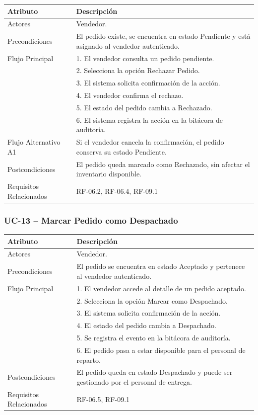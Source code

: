 \documentclass[12pt,a4paper]{report}
\begin{document}
\begin{longtable}{|p{4cm}|p{10cm}|}
\hline
\textbf{Atributo} & \textbf{Descripción} \\ \hline
Actores & Vendedor. \\ \hline
Precondiciones & El pedido existe, se encuentra en estado Pendiente y está asignado al vendedor autenticado. \\ \hline
Flujo Principal &
1. El vendedor consulta un pedido pendiente.\\
& 2. Selecciona la opción Rechazar Pedido.\\
& 3. El sistema solicita confirmación de la acción.\\
& 4. El vendedor confirma el rechazo.\\
& 5. El estado del pedido cambia a Rechazado.\\
& 6. El sistema registra la acción en la bitácora de auditoría. \\ \hline
Flujo Alternativo A1 & Si el vendedor cancela la confirmación, el pedido conserva su estado Pendiente. \\ \hline
Postcondiciones & El pedido queda marcado como Rechazado, sin afectar el inventario disponible. \\ \hline
Requisitos Relacionados & RF-06.2, RF-06.4, RF-09.1 \\ \hline
\end{longtable}


\subsubsection{UC-13 -- Marcar Pedido como Despachado}

\begin{longtable}{|p{4cm}|p{10cm}|}
\hline
\textbf{Atributo} & \textbf{Descripción} \\ \hline
Actores & Vendedor. \\ \hline
Precondiciones & El pedido se encuentra en estado Aceptado y pertenece al vendedor autenticado. \\ \hline
Flujo Principal &
1. El vendedor accede al detalle de un pedido aceptado.\\
& 2. Selecciona la opción Marcar como Despachado.\\
& 3. El sistema solicita confirmación de la acción.\\
& 4. El estado del pedido cambia a Despachado.\\
& 5. Se registra el evento en la bitácora de auditoría.\\
& 6. El pedido pasa a estar disponible para el personal de reparto. \\ \hline
Postcondiciones & El pedido queda en estado Despachado y puede ser gestionado por el personal de entrega. \\ \hline
Requisitos Relacionados & RF-06.5, RF-09.1 \\ \hline
\end{longtable}
\end{document}
